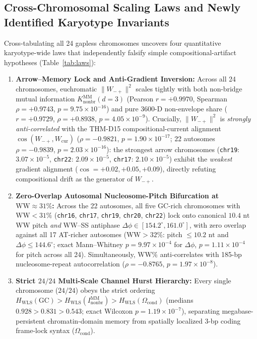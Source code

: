 \documentclass[11pt,a4paper]{article}
\newcommand{\Wmp}{W_{-+}}
\newcommand{\Inb}{I_{\mathrm{nonbr}}^{\mathrm{MM}}}
\begin{document}
\subsection{Cross-Chromosomal Scaling Laws and Newly Identified Karyotype Invariants}
\label{sec:scaling_laws}
Cross-tabulating all 24 gapless chromosomes uncovers four quantitative karyotype-wide laws that independently falsify simple compositional-artifact hypotheses (Table~\ref{tab:laws}):
\begin{enumerate}[label=(\arabic*),noitemsep,topsep=2pt]
  \item \textbf{Arrow--Memory Lock and Anti-Gradient Inversion:} Across all 24 chromosomes, euchromatic $\|\Wmp\|^2$ scales tightly with both non-bridge mutual information $K_{\mathrm{nonbr}}^{\mathrm{MM}}(d=3)$ (Pearson $r=+0.9970$, Spearman $\rho=+0.9743$, $p=9.75\times 10^{-16}$) and pure 3600-D non-envelope share ($r=+0.9729$, $\rho=+0.8938$, $p=4.05\times 10^{-9}$). Crucially, $\|\Wmp\|^2$ is \emph{strongly anti-correlated} with the THM-D15 compositional-current alignment $\cos(\Wmp, W_{\mathrm{cur}})$ ($\rho=-0.9821$, $p=1.90\times 10^{-17}$; 22 autosomes $\rho=-0.9839$, $p=2.03\times 10^{-16}$): the strongest arrow chromosomes (\texttt{chr19}: $3.07\times 10^{-5}$, \texttt{chr22}: $2.09\times 10^{-5}$, \texttt{chr17}: $2.10\times 10^{-5}$) exhibit the \emph{weakest} gradient alignment ($\cos = +0.02, +0.05, +0.09$), directly refuting compositional drift as the generator of $\Wmp$.
  \item \textbf{Zero-Overlap Autosomal Nucleosome-Pitch Bifurcation at $\mathrm{WW}\approx 31\%$:} Across the 22 autosomes, all five GC-rich chromosomes with $\mathrm{WW}<31\%$ (\texttt{chr16}, \texttt{chr17}, \texttt{chr19}, \texttt{chr20}, \texttt{chr22}) lock onto canonical $10.4\text{ nt}$ WW pitch \emph{and} WW--SS antiphase $\Delta\phi \in [154.2^\circ, 161.0^\circ]$, with zero overlap against all 17 AT-richer autosomes ($\mathrm{WW}>32\%$: pitch $\le 10.2\text{ nt}$ and $\Delta\phi \le 144.6^\circ$; exact Mann--Whitney $p=9.97\times 10^{-4}$ for $\Delta\phi$, $p=1.11\times 10^{-4}$ for pitch across all 24). Simultaneously, $\mathrm{WW}\%$ anti-correlates with 185-bp nucleosome-repeat autocorrelation ($\rho=-0.8765$, $p=1.97\times 10^{-8}$).
  \item \textbf{Strict $24/24$ Multi-Scale Channel Hurst Hierarchy:} Every single chromosome ($24/24$) obeys the strict ordering $H_{\mathrm{WLS}}(\mathrm{GC}) > H_{\mathrm{WLS}}(\Inb) > H_{\mathrm{WLS}}(\Omega_{\mathrm{cond}})$ (medians $0.928 > 0.831 > 0.543$; exact Wilcoxon $p=1.19\times 10^{-7}$), separating megabase-persistent chromatin-domain memory from spatially localized 3-bp coding frame-lock syntax ($\Omega_{\mathrm{cond}}$).

\end{enumerate}
\end{document}
